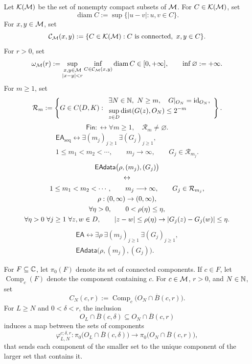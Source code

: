 Let \(\mathcal K(\mathcal M)\) be the set of nonempty compact subsets of
\(\mathcal M\). For \(C\in\mathcal K(\mathcal M)\), set
\[
 \operatorname{diam}C:=\sup\{|u-v|:u,v\in C\}.
\]
For \(x,y\in\mathcal M\), set
\[
 \mathcal C_\mathcal M(x,y):=
 \{C\in\mathcal K(\mathcal M):C\text{ is connected},\ x,y\in C\}.
\]
For \(r>0\), set
\[
 \omega_\mathcal M(r):=
  \sup_{\substack{x,y\in\mathcal M\\|x-y|<r}}
  \inf_{C\in\mathcal C_\mathcal M(x,y)}\operatorname{diam}C
  \in[0,+\infty],\qquad \inf\varnothing:=+\infty.
 \]
 For \(m\ge1\), set
 \[
  \mathcal R_m:=
 \left\{G\in C(D,K):
 \begin{array}{l}
 \exists N\in\mathbb N,\ N\ge m,\quad G|_{O_N}=\operatorname{id}_{O_N},\\[1mm]
 \displaystyle\sup_{z\in D}\operatorname{dist}(G(z),O_N)\le2^{-m}
 \end{array}
 \right\}.
\]
\[
 \mathsf{Fin}:\leftrightarrow
 \forall m\ge1,\quad\mathcal R_m\ne\varnothing.
 \]
\[
  \begin{gathered}
  \mathsf{EA}_{\mathrm{seq}}\leftrightarrow
  \exists(m_j)_{j\ge1}\ \exists(G_j)_{j\ge1},\\
  1\le m_1<m_2<\cdots,\qquad m_j\longrightarrow\infty,\qquad
  G_j\in\mathcal R_{m_j}.
  \end{gathered}
 \]
 \[
   \begin{gathered}
   \mathsf{EAdata}\bigl(\rho,(m_j),(G_j)\bigr)\\
  \leftrightarrow\\
  \begin{gathered}
  1\le m_1<m_2<\cdots,\qquad m_j\longrightarrow\infty,\qquad
  G_j\in\mathcal R_{m_j},\\
 \rho:(0,\infty)\to(0,\infty),\\
  \forall\eta>0,\qquad 0<\rho(\eta)\le\eta,\\
  \forall\eta>0\ \forall j\ge1\ \forall z,w\in D,\qquad
  |z-w|\le\rho(\eta)\to
  |G_j(z)-G_j(w)|\le\eta.
  \end{gathered}
 \end{gathered}
 \]
\[
 \begin{gathered}
 \mathsf{EA}\leftrightarrow
 \exists\rho\ \exists(m_j)_{j\ge1}\ \exists(G_j)_{j\ge1},\\
 \mathsf{EAdata}\bigl(\rho,(m_j),(G_j)\bigr).
 \end{gathered}
 \]

For \(F\subseteq\mathbb C\), let \(\pi_0(F)\) denote its set of connected
components. If \(c\in F\), let \(\operatorname{Comp}_c(F)\) denote the
component containing \(c\). For \(c\in\mathcal M\), \(r>0\), and \(N\in\mathbb N\),
set
\[
 C_N(c,r):=
 \operatorname{Comp}_c\bigl(O_N\cap\overline B(c,r)\bigr).
\]
For \(L\ge N\) and \(0<\delta<r\), the inclusion
\[
 O_L\cap\overline B(c,\delta)
 \subseteq O_N\cap\overline B(c,r)
\]
induces a map between the sets of components
\[
 \varphi_{L,N}^{c;\delta,r}:
 \pi_0\bigl(O_L\cap\overline B(c,\delta)\bigr)
 \longrightarrow
 \pi_0\bigl(O_N\cap\overline B(c,r)\bigr),
\]
that sends each component of the smaller set to the unique component
of the larger set that contains it.

